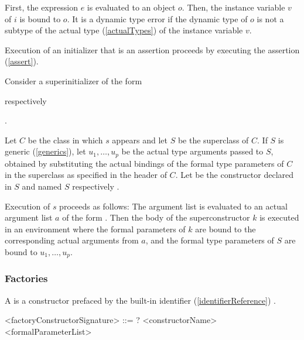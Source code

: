 \documentclass[makeidx]{article}
\begin{document}
\LMHash{}%
First, the expression $e$ is evaluated to an object $o$.
Then, the instance variable $v$ of $i$ is bound to $o$.
It is a dynamic type error if the dynamic type of $o$ is not
a subtype of the actual type
(\ref{actualTypes})
of the instance variable $v$.

\LMHash{}%
Execution of an initializer that is an assertion proceeds by
executing the assertion (\ref{assert}).

\LMHash{}%
Consider a superinitializer  of the form

\noindent
{}
respectively

\noindent
{}.

\LMHash{}%
%
Let $C$ be the class in which $s$ appears and let $S$ be the superclass of $C$.
If $S$ is generic (\ref{generics}),
let $u_1, \ldots, u_p$ be the actual type arguments passed to $S$,
obtained by substituting the actual bindings 
of the formal type parameters of $C$
in the superclass as specified in the header of $C$.
Let  be the constructor declared in $S$ and named
$S$ respectively .

\LMHash{}%
Execution of $s$ proceeds as follows:
The argument list
is evaluated to an actual argument list $a$ of the form
.
Then the body of the superconstructor $k$ is executed
in an environment where the formal parameters of $k$ are bound to
the corresponding actual arguments from $a$,
and the formal type parameters of $S$ are bound to $u_1, \ldots, u_p$.


\subsubsection{Factories}

\LMHash{}%
A 
is a constructor prefaced by the built-in identifier
(\ref{identifierReference})
\FACTORY.

\begin{grammar}
<factoryConstructorSignature> ::= \gnewline{}
  \CONST? \FACTORY{} <constructorName> <formalParameterList>
\end{grammar}
\end{document}
